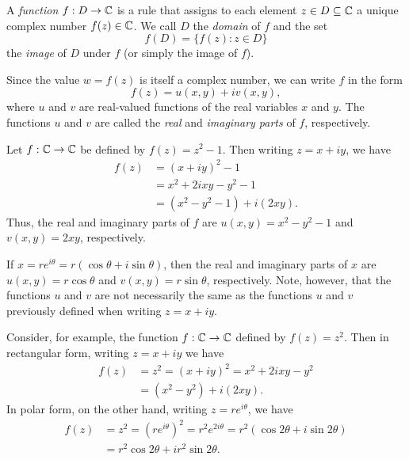\begin{definition}
    A \emph{function} \(f : D \to \mathbb{C}\) is a rule that assigns to each element \(z \in D \subseteq \mathbb{C}\) a unique complex number \(f(z) \in \mathbb{C}\). We call \(D\) the \emph{domain} of \(f\) and the set
    \[
        f(D) = \{f(z) : z \in D\}
    \]
    the \emph{image} of \(D\) under \(f\) (or simply the image of \(f\)).
    \label{def:complex-function}
\end{definition}

Since the value \(w = f(z)\) is itself a complex number, we can write \(f\) in the form
\[
    f(z) = u(x, y) + iv(x, y),
\]
where \(u\) and \(v\) are real-valued functions of the real variables \(x\) and \(y\). The functions \(u\) and \(v\) are called the \emph{real} and \emph{imaginary parts} of \(f\), respectively.

\begin{example}
    Let \(f : \mathbb{C} \to \mathbb{C}\) be defined by \(f(z) = z^2 - 1\). Then writing \(z = x + iy\), we have
    \[
        \begin{aligned}
            f(z) &= (x + iy)^2 - 1 \\
            &= x^2 + 2ixy - y^2 - 1 \\
            &= (x^2 - y^2 - 1) + i(2xy).
        \end{aligned}
    \]
    Thus, the real and imaginary parts of \(f\) are \(u(x, y) = x^2 - y^2 - 1\) and \(v(x, y) = 2xy\), respectively.
\end{example}

\begin{example}
    If \(x = re^{i\theta} = r(\cos\theta + i\sin\theta)\), then the real and imaginary parts of \(x\) are \(u(x, y) = r\cos\theta\) and \(v(x, y) = r\sin\theta\), respectively. Note, however, that the functions \(u\) and \(v\) are not necessarily the same as the functions \(u\) and \(v\) previously defined when writing \(z = x+ iy\).

    Consider, for example, the function \(f : \mathbb{C} \to \mathbb{C}\) defined by \(f(z) = z^2\). Then in rectangular form, writing \(z = x + iy\) we have
    \begin{align*}
        f(z) & = z^2 = (x + iy)^2 = x^2 + 2ixy - y^2\\
        & = (x^2 - y^2) + i(2xy).
    \end{align*}
    In polar form, on the other hand, writing \(z = re^{i\theta}\), we have
    \begin{align*}
        f(z) & = z^2  = (re^{i\theta})^2 = r^2e^{2i\theta} = r^2(\cos 2\theta + i\sin 2\theta)\\
        & = r^2\cos 2\theta + ir^2\sin 2\theta.
    \end{align*}
\end{example}

